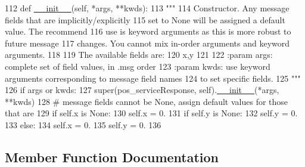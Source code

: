 \begin{DoxyCode}
112   \textcolor{keyword}{def }\hyperlink{classstate__machine_1_1Play_a5993a23d8be7f7b2647f71ede0334957}{\_\_init\_\_}(self, *args, **kwds):
113     \textcolor{stringliteral}{"""}
114 \textcolor{stringliteral}{    Constructor. Any message fields that are implicitly/explicitly}
115 \textcolor{stringliteral}{    set to None will be assigned a default value. The recommend}
116 \textcolor{stringliteral}{    use is keyword arguments as this is more robust to future message}
117 \textcolor{stringliteral}{    changes.  You cannot mix in-order arguments and keyword arguments.}
118 \textcolor{stringliteral}{}
119 \textcolor{stringliteral}{    The available fields are:}
120 \textcolor{stringliteral}{       x,y}
121 \textcolor{stringliteral}{}
122 \textcolor{stringliteral}{    :param args: complete set of field values, in .msg order}
123 \textcolor{stringliteral}{    :param kwds: use keyword arguments corresponding to message field names}
124 \textcolor{stringliteral}{    to set specific fields.}
125 \textcolor{stringliteral}{    """}
126     \textcolor{keywordflow}{if} args \textcolor{keywordflow}{or} kwds:
127       super(pos\_serviceResponse, self).\hyperlink{classstate__machine_1_1Play_a5993a23d8be7f7b2647f71ede0334957}{\_\_init\_\_}(*args, **kwds)
128       \textcolor{comment}{# message fields cannot be None, assign default values for those that are}
129       \textcolor{keywordflow}{if} self.x \textcolor{keywordflow}{is} \textcolor{keywordtype}{None}:
130         self.x = 0.
131       \textcolor{keywordflow}{if} self.y \textcolor{keywordflow}{is} \textcolor{keywordtype}{None}:
132         self.y = 0.
133     \textcolor{keywordflow}{else}:
134       self.x = 0.
135       self.y = 0.
136 
\end{DoxyCode}


\subsection{Member Function Documentation}
\mbox{\label{classpos__server_1_1srv_1_1__pos__service_1_1pos__serviceResponse_ab47ab86d54dc948d26a720a9cc460737}} 
